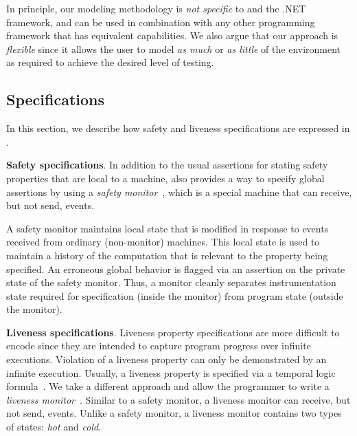 In principle, our modeling methodology is \emph{not specific} to \psharp and the .NET framework, and can be used in combination with any other programming framework that has equivalent capabilities. We also argue that our approach is \emph{flexible} since it allows the user to model \emph{as much} or \emph{as little} of the environment as required to achieve the desired level of testing.

\subsection{Specifications}
\label{sec:bg:bugs}

In  this section, we describe how safety and liveness specifications are expressed in \psharp.

\textbf{Safety specifications}.
In addition to the usual assertions for stating safety properties that are local to a machine, \psharp also provides a way to specify global assertions by using a \emph{safety monitor}~\cite{desai2015building}, which is a special machine that can receive, but not send, events.

A safety monitor maintains local state that is modified in response to events received from ordinary (non-monitor) machines. This local state is used to maintain a history of the computation that is relevant to the property being specified. An erroneous global behavior is flagged via an assertion on the private state of the safety monitor. Thus, a \psharp monitor cleanly separates instrumentation state required for specification (inside the monitor) from program state (outside the monitor).

\textbf{Liveness specifications}.
Liveness property specifications are more difficult to encode since they are intended to capture program progress over infinite executions. Violation of a liveness property can only be demonstrated by an infinite execution. Usually, a liveness property is specified via a temporal logic formula~\cite{Pnueli1977,lamport1994temporal}. We take a different approach and allow the programmer to write a \emph{liveness monitor}~\cite{desai2015building}. Similar to a safety monitor, a liveness monitor can receive, but not send, events. Unlike a safety monitor, a liveness monitor contains two types of states: \emph{hot} and \emph{cold}.

